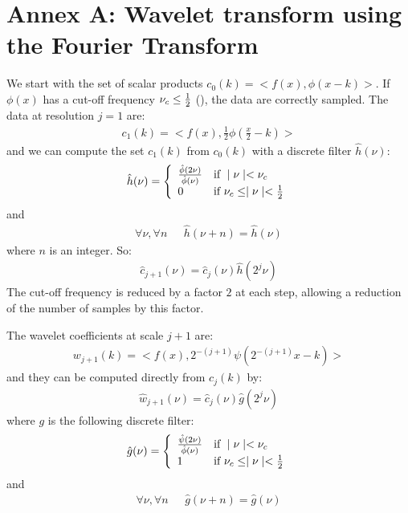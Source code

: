 \section*{Annex A: Wavelet transform  using the Fourier Transform}

We start with the set of scalar products $c_0(k)=<f(x),\phi(x-k)>$. If
$\phi(x)$ has a cut-off frequency $\nu_c\le {1\over 2}$
(\cite{starck:sta94_3,starck:sta94_4,starck:book98}), 
the data are
correctly sampled. The data at resolution $j=1$ are:
\begin{eqnarray}
c_1(k)=<f(x),\frac{1}{2}\phi(\frac{x}{2}-k)>
\end{eqnarray}
and we can  compute the set $c_{1}(k)$ from $c_0(k)$ with a discrete 
filter $\hat h(\nu)$:
\begin{eqnarray}
\hat h(\nu)= \left\{
  \begin{array}{ll}
  {\hat{\phi}(2\nu)\over \hat{\phi}(\nu)} & \mbox{if } \mid \nu \mid < \nu_c \\
0 & \mbox{if } \nu_c  \leq \mid \nu \mid < {1\over 2} 
  \end{array}
  \right.
\end{eqnarray}
and
\begin{eqnarray}
\forall \nu, \forall n \mbox{    } & \hat h(\nu + n) = \hat h(\nu)
\end{eqnarray}
where $n$ is an integer.
So:
\begin{eqnarray}
\hat{c}_{j+1}(\nu)=\hat{c}_{j}(\nu)\hat{h}(2^{j}\nu)
\end{eqnarray}
The cut-off frequency is reduced by a factor $2$ at each step, allowing  a
reduction of the number of samples by this factor.

The wavelet coefficients at scale $j+1$ are:
\begin{eqnarray}
w_{j+1}(k)=<f(x),2^{-(j+1)}\psi(2^{-(j+1)}x-k)>
\end{eqnarray}
and they can be computed directly from $c_j(k)$ by:
\begin{eqnarray}
\hat{w}_{j+1}(\nu)=\hat{c}_{j}(\nu)\hat g(2^{j}\nu)
\end{eqnarray}
where $g$ is the following  discrete filter:
\begin{eqnarray}
\hat g(\nu)= \left\{
  \begin{array}{ll}
  {\hat{\psi}(2\nu)\over \hat{\phi}(\nu)} & \mbox{if } \mid \nu \mid < \nu_c \\
1 & \mbox{if } \nu_c  \leq \mid \nu \mid < {1\over 2} 
  \end{array}
  \right.
\end{eqnarray}
and
\begin{eqnarray}
\forall \nu, \forall n \mbox{    } & \hat g(\nu + n) = \hat g(\nu)
\end{eqnarray}

